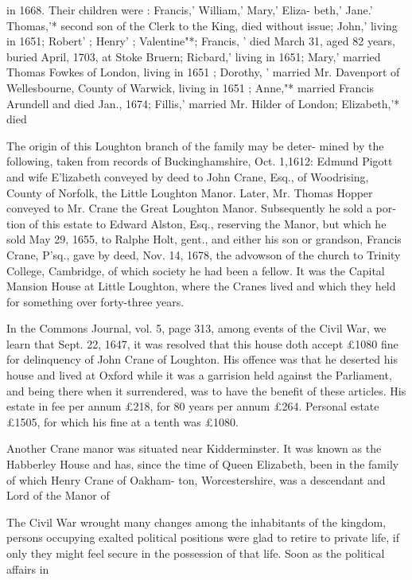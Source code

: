 \documentclass[oneside]{book}
\begin{document}
in 1668. Their children were : Francis,' William,' Mary,' Eliza- 
beth,' Jane.' Thomas,'* second son of the Clerk to the King, 
died without issue; John,' living in 1651; Robert' ; Henry' ; 
Valentine"*; Francis, ' died March 31, aged 82 years, buried 
April, 1703, at Stoke Bruern; Ricbard,' living in 1651; Mary,' 
married Thomas Fowkes of London, living in 1651 ; Dorothy, ' 
married Mr. Davenport of Wellesbourne, County of Warwick, 
living in 1651 ; Anne,"* married Francis Arundell and died Jan., 
1674; Fillis,' married Mr. Hilder of London; Elizabeth,'* died 

The origin of this Loughton branch of the family may be deter- 
mined by the following, taken from records of Buckinghamshire, 
Oct. 1,1612: Edmund Pigott and wife E'lizabeth conveyed by deed 
to John Crane, Esq., of Woodrising, County of Norfolk, the Little 
Loughton Manor. Later, Mr. Thomas Hopper conveyed to Mr. 
Crane the Great Loughton Manor. Subsequently he sold a por- 
tion of this estate to Edward Alston, Esq., reserving the Manor, 
but which he sold May 29, 1655, to Ralphe Holt, gent., and 
either his son or grandson, Francis Crane, P'sq., gave by deed, 
Nov. 14, 1678, the advowson of the church to Trinity College, 
Cambridge, of which society he had been a fellow. It was the 
Capital Mansion House at Little Loughton, where the Cranes 
lived and which they held for something over forty-three years. 

In the Commons Journal, vol. 5, page 313, among events of the 
Civil War, we learn that Sept. 22, 1647, it was resolved that this 
house doth accept £1080 fine for delinquency of John Crane of 
Loughton. His offence was that he deserted his house and lived 
at Oxford while it was a garrision held against the Parliament, 
and being there when it surrendered, was to have the benefit of 
these articles. His estate in fee per annum £218, for 80 years 
per annum £264. Personal estate £1505, for which his fine at a 
tenth was £1080. 

Another Crane manor was situated near Kidderminster. It was 
known as the Habberley House and has, since the time of Queen 
Elizabeth, been in the family of which Henry Crane of Oakham- 
ton, Worcestershire, was a descendant and Lord of the Manor of 

The Civil War wrought many changes among the inhabitants 
of the kingdom, persons occupying exalted political positions 
were glad to retire to private life, if only they might feel secure 
in the possession of that life. Soon as the political affairs in 
\end{document}
